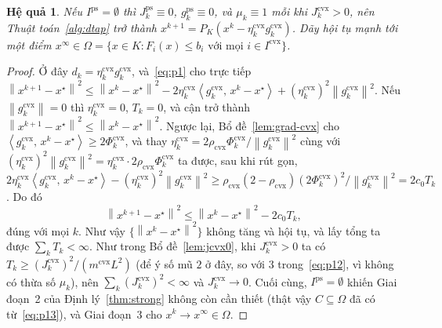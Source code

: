 \documentclass[]{interact}
\theoremstyle{plain}
\newtheorem{corollary}[theorem]{Hệ quả}
\theoremstyle{definition}
\theoremstyle{remark}
\newcommand{\norm}[1]{\left\lVert #1 \right\rVert}
\newcommand{\inner}[2]{\left\langle #1,\, #2 \right\rangle}
\newcommand{\cvx}{\mathrm{cvx}}
\newcommand{\ps}{\mathrm{ps}}
\begin{document}
\begin{corollary}\label{cor:cvx}
Nếu $I^{\ps}=\emptyset$ thì $J^{\ps}_k\equiv0$, $g^{\ps}_k\equiv0$, và $\mu_k\equiv1$
mỗi khi $J^{\cvx}_k>0$, nên Thuật toán~\ref{alg:dtap} trở thành
$x^{k+1}=P_K(x^k-\eta^{\cvx}_k g^{\cvx}_k)$. Dãy hội tụ mạnh tới một điểm
$x^\infty\in\Omega=\{x\in K:F_i(x)\le b_i\text{ với mọi }i\in I^{\cvx}\}$.
\end{corollary}
\begin{proof}
Ở đây $d_k=\eta^{\cvx}_k g^{\cvx}_k$, và~\eqref{eq:p1} cho trực tiếp
$\norm{x^{k+1}-x^\star}^2\le\norm{x^k-x^\star}^2-2\eta^{\cvx}_k\inner{g^{\cvx}_k}{x^k-x^\star}+(\eta^{\cvx}_k)^2\norm{g^{\cvx}_k}^2$.
Nếu $\norm{g^{\cvx}_k}=0$ thì $\eta^{\cvx}_k=0$, $T_k=0$, và cận trở thành
$\norm{x^{k+1}-x^\star}^2\le\norm{x^k-x^\star}^2$. Ngược lại, Bổ đề~\ref{lem:grad-cvx} cho
$\inner{g^{\cvx}_k}{x^k-x^\star}\ge2\Phi^{\cvx}_k$, và thay
$\eta^{\cvx}_k=2\rho_{\cvx}\Phi^{\cvx}_k/\norm{g^{\cvx}_k}^2$ cùng với
$(\eta^{\cvx}_k)^2\norm{g^{\cvx}_k}^2=\eta^{\cvx}_k\cdot2\rho_{\cvx}\Phi^{\cvx}_k$ ta được, sau khi
rút gọn,
$2\eta^{\cvx}_k\inner{g^{\cvx}_k}{x^k-x^\star}-(\eta^{\cvx}_k)^2\norm{g^{\cvx}_k}^2\ge\rho_{\cvx}(2-\rho_{\cvx})(2\Phi^{\cvx}_k)^2/\norm{g^{\cvx}_k}^2=2c_0T_k$.
Do đó
\begin{equation}\label{eq:p15}
\norm{x^{k+1}-x^\star}^2\le\norm{x^k-x^\star}^2-2c_0T_k ,
\end{equation}
đúng với mọi $k$. Như vậy $\{\norm{x^k-x^\star}^2\}$ không tăng và hội tụ, và
lấy tổng ta được $\sum_k T_k<\infty$. Như trong Bổ đề~\ref{lem:jcvx0}, khi $J^{\cvx}_k>0$ ta có
$T_k\ge(J^{\cvx}_k)^2/(m^{\cvx}L^2)$ (để ý số mũ $2$ ở đây, so với $3$
trong~\eqref{eq:p12}, vì không có thừa số $\mu_k$), nên $\sum_k(J^{\cvx}_k)^2<\infty$ và
$J^{\cvx}_k\to0$. Cuối cùng, $I^{\ps}=\emptyset$ khiến Giai đoạn~2 của
Định lý~\ref{thm:strong} không còn cần thiết (thật vậy $C\subseteq\Omega$ đã có
từ~\eqref{eq:p13}), và Giai đoạn~3 cho $x^k\to x^\infty\in\Omega$.
\end{proof}
\end{document}
